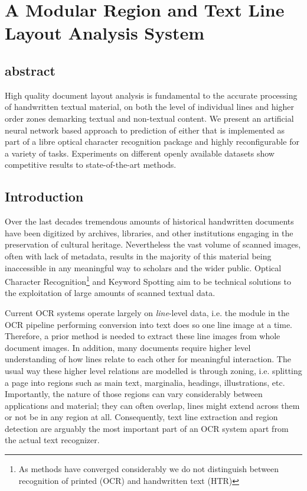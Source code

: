 \chapter{A Modular Region and Text Line Layout Analysis System}

\section{abstract}
High quality document layout analysis is fundamental to the accurate processing
of handwritten textual material, on both the level of individual lines and
higher order zones demarking textual and non-textual content. We present an
artificial neural network based approach to prediction of either that is
implemented as part of a libre optical character recognition package and highly
reconfigurable for a variety of tasks. Experiments on different openly
available datasets show competitive results to state-of-the-art methods.

\section{Introduction}

Over the last decades tremendous amounts of historical handwritten documents
have been digitized by archives, libraries, and other institutions engaging in
the preservation of cultural heritage. Nevertheless the vast volume of scanned
images, often with lack of metadata, results in the majority of this material
being inaccessible in any meaningful way to scholars and the wider public.
Optical Character Recognition\footnote{As methods have converged considerably
we do not distinguish between recognition of printed (OCR) and handwritten text
(HTR)} and Keyword Spotting aim to be technical solutions to the exploitation
of large amounts of scanned textual data. 

Current OCR systems operate largely on \emph{line}-level data, i.e. the module
in the OCR pipeline performing conversion into text does so one line image at a
time. Therefore, a prior method is needed to extract these line images from
whole document images. In addition, many documents require higher level
understanding of how lines relate to each other for meaningful interaction. The
usual way these higher level relations are modelled is through zoning, i.e.
splitting a page into regions such as main text, marginalia, headings,
illustrations, etc. Importantly, the nature of those regions can vary
considerably between applications and material; they can often overlap, lines
might extend across them or not be in any region at all. Consequently, text
line extraction and region detection are arguably the most important part of an
OCR system apart from the actual text recognizer.


